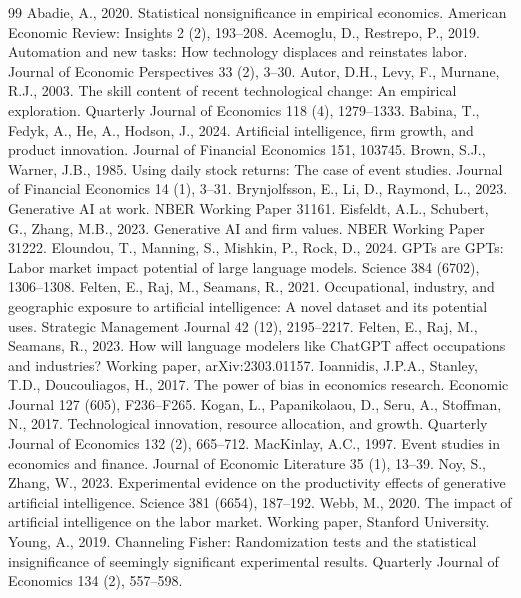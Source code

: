\documentclass[12pt]{article}
\begin{document}
\begin{thebibliography}{99}
 Abadie, A., 2020. Statistical nonsignificance in empirical
economics. American Economic Review: Insights 2 (2), 193--208.
 Acemoglu, D., Restrepo, P., 2019.
Automation and new tasks: How technology displaces and reinstates labor.
Journal of Economic Perspectives 33 (2), 3--30.
 Autor, D.H., Levy, F., Murnane, R.J., 2003.
The skill content of recent technological change: An empirical exploration.
Quarterly Journal of Economics 118 (4), 1279--1333.
 Babina, T., Fedyk, A., He, A., Hodson, J., 2024.
Artificial intelligence, firm growth, and product innovation.
Journal of Financial Economics 151, 103745.
 Brown, S.J., Warner, J.B., 1985.
Using daily stock returns: The case of event studies.
Journal of Financial Economics 14 (1), 3--31.
 Brynjolfsson, E., Li, D., Raymond, L., 2023.
Generative AI at work. NBER Working Paper 31161.
 Eisfeldt, A.L., Schubert, G., Zhang, M.B., 2023.
Generative AI and firm values. NBER Working Paper 31222.
 Eloundou, T., Manning, S., Mishkin, P., Rock, D., 2024.
GPTs are GPTs: Labor market impact potential of large language models. Science 384 (6702), 1306--1308.
 Felten, E., Raj, M., Seamans, R., 2021.
Occupational, industry, and geographic exposure to artificial intelligence: A novel dataset
and its potential uses. Strategic Management Journal 42 (12), 2195--2217.
 Felten, E., Raj, M., Seamans, R., 2023.
How will language modelers like ChatGPT affect occupations and industries?
Working paper, arXiv:2303.01157.
 Ioannidis, J.P.A., Stanley, T.D., Doucouliagos, H.,
2017. The power of bias in economics research. Economic Journal 127 (605), F236--F265.
 Kogan, L., Papanikolaou, D., Seru, A., Stoffman, N., 2017.
Technological innovation, resource allocation, and growth.
Quarterly Journal of Economics 132 (2), 665--712.
 MacKinlay, A.C., 1997.
Event studies in economics and finance. Journal of Economic Literature 35 (1), 13--39.
 Noy, S., Zhang, W., 2023.
Experimental evidence on the productivity effects of generative artificial intelligence.
Science 381 (6654), 187--192.
 Webb, M., 2020.
The impact of artificial intelligence on the labor market. Working paper, Stanford University.
 Young, A., 2019. Channeling Fisher: Randomization tests and the
statistical insignificance of seemingly significant experimental results. Quarterly Journal of
Economics 134 (2), 557--598.
\end{thebibliography}
\end{document}
